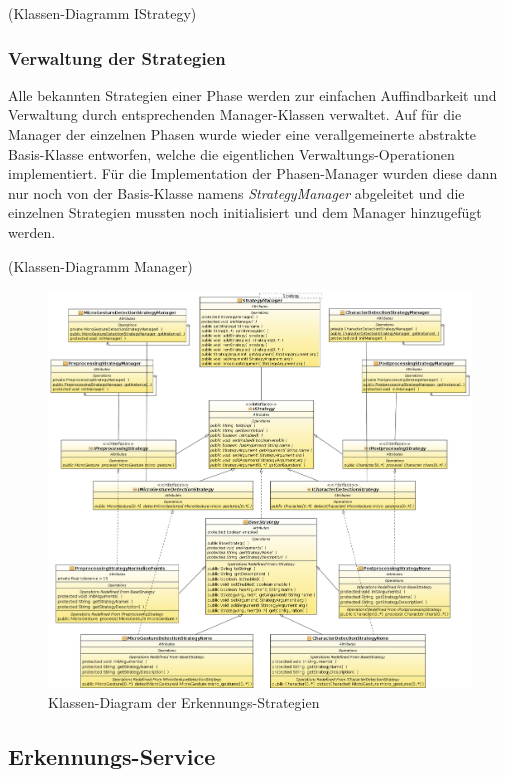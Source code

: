 (Klassen-Diagramm IStrategy)

\subsubsection{Verwaltung der Strategien}

Alle bekannten Strategien einer Phase werden zur einfachen Auffindbarkeit und Verwaltung durch entsprechenden Manager-Klassen verwaltet. Auf für die Manager der einzelnen Phasen wurde wieder eine verallgemeinerte abstrakte Basis-Klasse entworfen, welche die eigentlichen Verwaltungs-Operationen implementiert. Für die Implementation der Phasen-Manager wurden diese dann nur noch von der Basis-Klasse namens \emph{StrategyManager} abgeleitet und die einzelnen Strategien mussten noch initialisiert und dem Manager hinzugefügt werden.

(Klassen-Diagramm Manager)

\begin{figure}[h]
   \centering
   \includegraphics[width=\textwidth]{img/uml_cd_strategies} 
   \caption{Klassen-Diagram der Erkennungs-Strategien}
   \label{fig:cl_strategies}
\end{figure}

\subsection{Erkennungs-Service}

